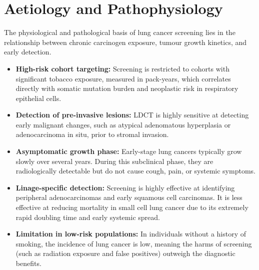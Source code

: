 \section*{Aetiology and Pathophysiology}
The physiological and pathological basis of lung cancer screening lies in the relationship between chronic carcinogen exposure, tumour growth kinetics, and early detection.
\begin{itemize}
    \item \textbf{High-risk cohort targeting:} Screening is restricted to cohorts with significant tobacco exposure, measured in pack-years, which correlates directly with somatic mutation burden and neoplastic risk in respiratory epithelial cells.
    \item \textbf{Detection of pre-invasive lesions:} LDCT is highly sensitive at detecting early malignant changes, such as atypical adenomatous hyperplasia or adenocarcinoma in situ, prior to stromal invasion.
    \item \textbf{Asymptomatic growth phase:} Early-stage lung cancers typically grow slowly over several years. During this subclinical phase, they are radiologically detectable but do not cause cough, pain, or systemic symptoms.
    \item \textbf{Linage-specific detection:} Screening is highly effective at identifying peripheral adenocarcinomas and early squamous cell carcinomas. It is less effective at reducing mortality in small cell lung cancer due to its extremely rapid doubling time and early systemic spread.
    \item \textbf{Limitation in low-risk populations:} In individuals without a history of smoking, the incidence of lung cancer is low, meaning the harms of screening (such as radiation exposure and false positives) outweigh the diagnostic benefits.
\end{itemize}

